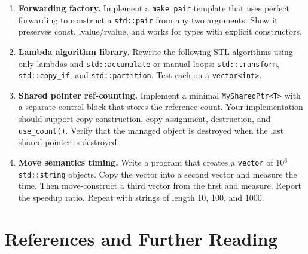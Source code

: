 \begin{enumerate}
\item \textbf{Forwarding factory.} Implement a \texttt{make\_pair} template that uses perfect forwarding to construct a \texttt{std::pair} from any two arguments. Show it preserves const, lvalue/rvalue, and works for types with explicit constructors.

\item \textbf{Lambda algorithm library.} Rewrite the following STL algorithms using only lambdas and \texttt{std::accumulate} or manual loops: \texttt{std::transform}, \texttt{std::copy\_if}, and \texttt{std::partition}. Test each on a \texttt{vector<int>}.

\item \textbf{Shared pointer ref-counting.} Implement a minimal \texttt{MySharedPtr<T>} with a separate control block that stores the reference count. Your implementation should support copy construction, copy assignment, destruction, and \texttt{use\_count()}. Verify that the managed object is destroyed when the last shared pointer is destroyed.

\item \textbf{Move semantics timing.} Write a program that creates a \texttt{vector} of 10$^{6}$ \texttt{std::string} objects. Copy the vector into a second vector and measure the time. Then move-construct a third vector from the first and measure. Report the speedup ratio. Repeat with strings of length 10, 100, and 1000.
\end{enumerate}

\section{References and Further Reading}

